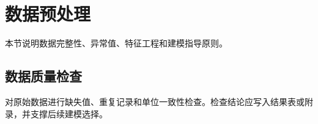 \section{数据预处理}

本节说明数据完整性、异常值、特征工程和建模指导原则。

\subsection{数据质量检查}

对原始数据进行缺失值、重复记录和单位一致性检查。检查结论应写入结果表或附录，并支撑后续建模选择。
